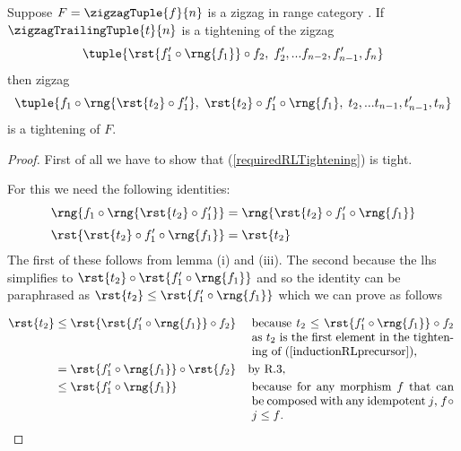 {  %
  \newcommand{\tightTail}
  {\rst{f'_1 \circ \rng{f_1}} \circ f_2,\;
  f'_2,...f_{n-2},f'_{n-1}, f_n
  }      

\newcommand{\requiredRLTightening}
{\tuple{f_1 \circ \rng{\rst{t_2} \circ f'_1},\;
        \rst{t_2} \circ f'_1 \circ \rng{f_1},\; 
        t_2    ,...t_{n-1},t'_{n-1},t_n
    }
}
\begin{lemma}
Suppose  $F=\zigzagTuple{f}{n}$ is a zigzag in range category \catcw.
If  $\zigzagTrailingTuple{t}{n}$ is a tightening of the zigzag
\begin{equation}
\label{inductionRLprecursor}
\tuple{\tightTail}
\end{equation}
then  zigzag
\begin{equation}
\label{requiredRLTightening}\requiredRLTightening
\end{equation}
is a tightening of $F$. 
\end{lemma}
\begin{proof}
First of all we have to show that (\ref{requiredRLTightening}) is tight. 

For this we need the following identities:
\begin{align}
\label{RLtightnessIdentityOne}
\rng{f_1 \circ \rng{\rst{t_2} \circ f'_1}}&=\rng{\rst{t_2} \circ f'_1 \circ \rng{f_1}}   \\[0.1cm]
\label{RLtightnessIdentityTwo}
\rst{\rst{t_2} \circ f'_1 \circ \rng{f_1}}&=\rst{t_2}
\end{align}
The first of these follows from lemma  (i) and (iii).
The second because the lhs simplifies to 
$\rst{t_2} \circ \rst{f'_1 \circ \rng{f_1}}$
and so the identity can be paraphrased as 
$\rst{t_2} \leq \rst{f'_1 \circ \rng{f_1}}$ 
which we can prove as follows 

\newcommand{\stepOneReason}{
\parbox[t]{6cm}{because $t_2 \leq \rst{f'_1 \circ \rng{f_1}} \circ f_2$
as $t_2$ is the first element in the tightening of (\ref{inductionRLprecursor}),
}
}
\newcommand{\stepThreeReason}{
\parbox[t]{6cm}{because for any morphism $f$ 
                that can be composed with any idempotent $j$,
                    $f \circ j \leq f$.
}
}
\begin{align*}
\rst{t_2} &\leq \rst{\rst{f'_1 \circ \rng{f_1}} \circ f_2}
                && \mbox{\stepOneReason} \\
          &= \rst{f'_1 \circ \rng{f_1}} \circ \rst{f_2} 
                && \mbox{by R.3,} \\
          &\leq \rst{f'_1 \circ \rng{f_1}}
                && \mbox{\stepThreeReason}
\end{align*}



\end{proof}}
